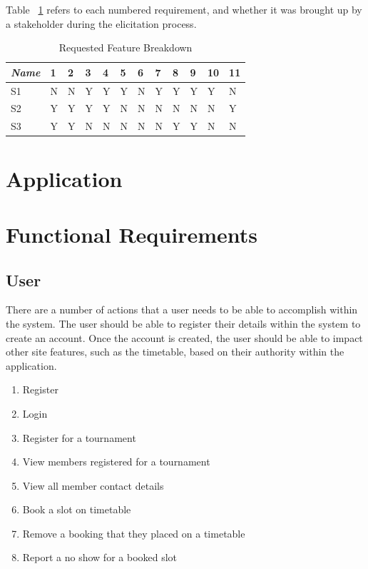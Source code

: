 Table ~\ref{fig:reqbreakdown} refers to each numbered requirement, and whether it was brought up by a stakeholder during the elicitation process.
\begin{table}[H]
\caption{Requested Feature Breakdown}
\begin{center}
    \begin{tabular}{ | l | l | l | l | l| l| l| l| l| l|l| p{.22cm} |}
    \hline
     \textit{Name}& 1& 2 & 3 & 4 & 5 & 6 & 7 & 8 & 9 & 10 & 11\\ \hline
	 S1 & N & N & Y & Y & Y & N & Y & Y & Y & Y & N\\ \hline
	  S2 & Y & Y & Y & Y & N & N & N & N & N & N & Y\\ \hline
	    S3 & Y & Y & N & N & N & N & N & Y & Y & N & N\\ \hline
    \end{tabular}
\end{center}
\label{fig:reqbreakdown}
\end{table}


\section{Application}

\section{Functional Requirements}

\subsection{User} 

There are a number of actions that a user needs to be able to accomplish within the system. The user should be able to register their details within the system to create an account. Once the account is created, the user should be able to impact other site features, such as the timetable, based on their authority within the application. 

\begin{enumerate}
\item Register
\item Login
\item Register for a tournament
\item View members registered for a tournament
\item View all member contact details
\item Book a slot on timetable
\item Remove a booking that they placed on a timetable
\item Report a no show for a booked slot
\end{enumerate}

